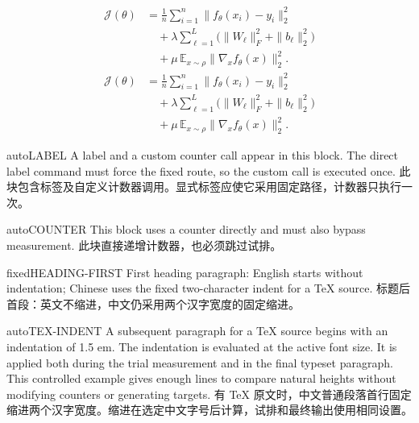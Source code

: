 \begin{equationpair}\begin{equation}\begin{aligned}
\mathcal J(\theta)&=\frac1n\sum_{i=1}^n\|f_\theta(x_i)-y_i\|_2^2\\
&\quad+\lambda\sum_{\ell=1}^L\bigl(\|W_\ell\|_F^2+\|b_\ell\|_2^2\bigr)\\
&\quad+\mu\,\mathbb E_{x\sim\rho}\|\nabla_x f_\theta(x)\|_2^2.
\end{aligned}\tag{1}\label{eq:long:en}\end{equation}\switchcolumn\begin{equation}\begin{aligned}
\mathcal J(\theta)&=\frac1n\sum_{i=1}^n\|f_\theta(x_i)-y_i\|_2^2\\
&\quad+\lambda\sum_{\ell=1}^L\bigl(\|W_\ell\|_F^2+\|b_\ell\|_2^2\bigr)\\
&\quad+\mu\,\mathbb E_{x\sim\rho}\|\nabla_x f_\theta(x)\|_2^2.
\end{aligned}\tag{1}\label{eq:long:zh}\end{equation}\end{equationpair}
\begin{demopair}{auto}{LABEL}
\ENIndent\noindent\ProbeOnce{}\label{probe:label:en}A label and a custom counter call appear in this block. The direct label command must force the fixed route, so the custom call is executed once.
\switchcolumn
\ZHIndent\ProbeOnce{}\label{probe:label:zh}此块包含标签及自定义计数器调用。显式标签应使它采用固定路径，计数器只执行一次。
\end{demopair}
\begin{demopair}{auto}{COUNTER}
\ENIndent\noindent{}This block uses a counter directly and must also bypass measurement.
\switchcolumn
\ZHIndent{}此块直接递增计数器，也必须跳过试排。
\end{demopair}
\begin{demopair}{fixed}{HEADING-FIRST}
\ENIndent\noindent First heading paragraph: English starts without indentation; Chinese uses the fixed two-character indent for a TeX source.
\switchcolumn
\ZHIndent 标题后首段：英文不缩进，中文仍采用两个汉字宽度的固定缩进。
\end{demopair}
\begin{demopair}{auto}{TEX-INDENT}
\ENIndent A subsequent paragraph for a TeX source begins with an indentation of 1.5 em. The indentation is evaluated at the active font size. It is applied both during the trial measurement and in the final typeset paragraph. This controlled example gives enough lines to compare natural heights without modifying counters or generating targets.
\switchcolumn
\ZHIndent 有 TeX 原文时，中文普通段落首行固定缩进两个汉字宽度。缩进在选定中文字号后计算，试排和最终输出使用相同设置。
\end{demopair}
